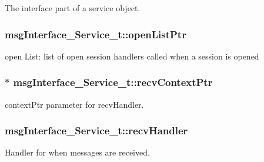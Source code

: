 The interface part of a service object. 

\subsubsection[{\texorpdfstring{open\+List\+Ptr}{openListPtr}}]{ msg\+Interface\+\_\+\+Service\+\_\+t\+::open\+List\+Ptr}\hypertarget{structmsg_interface___service__t_a1ad3d18bbf1ba2d6a3fcdabb199951e0}{}\label{structmsg_interface___service__t_a1ad3d18bbf1ba2d6a3fcdabb199951e0}
open List\+: list of open session handlers called when a session is opened 
\subsubsection[{\texorpdfstring{recv\+Context\+Ptr}{recvContextPtr}}]{$\ast$ msg\+Interface\+\_\+\+Service\+\_\+t\+::recv\+Context\+Ptr}\hypertarget{structmsg_interface___service__t_a2fb47f59f32f15485514d79ed8b748a6}{}\label{structmsg_interface___service__t_a2fb47f59f32f15485514d79ed8b748a6}


context\+Ptr parameter for recv\+Handler. 

\subsubsection[{\texorpdfstring{recv\+Handler}{recvHandler}}]{ msg\+Interface\+\_\+\+Service\+\_\+t\+::recv\+Handler}\hypertarget{structmsg_interface___service__t_a23b44957bb235bf02c52c09884905113}{}\label{structmsg_interface___service__t_a23b44957bb235bf02c52c09884905113}


Handler for when messages are received. 

